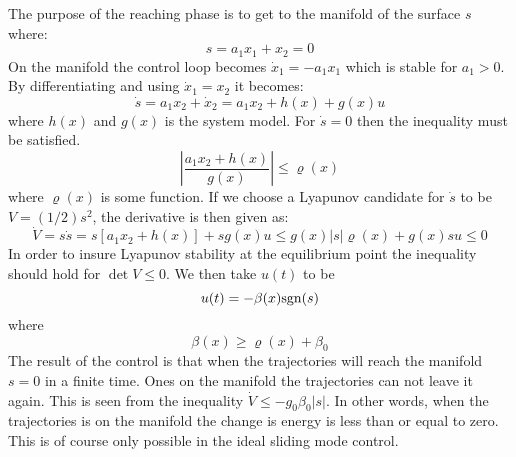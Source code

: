 The purpose of the reaching phase is to get to the manifold of the surface $s$ where:
\begin{equation}
  s = a_1 x_1 + x_2 = 0
\end{equation}
On the manifold the control loop becomes $ \dot{x}_1 = - a_1 x_1$ which is stable for $ a_1 > 0$.
By differentiating and using $ \dot{x}_1 = x_2 $ it becomes:
\begin{equation}
        \dot{s} = a_1 x_2 + \dot{x}_2 = a_1 x_2 + h(x) + g(x)u
\end{equation}
where $h(x)$ and $g(x)$ is the system model. For $\dot{s} = 0$ then the inequality must be satisfied.
\begin{equation}
        \left\vert \frac{a_1 x_2 + h(x)}{g(x)} \right\vert \leq \varrho(x)
\end{equation}
where $\varrho(x)$ is some function. If we choose a Lyapunov candidate for $\dot{s}$ to be $V = (1/2)s^2$, the derivative is then given as:
\begin{equation}
  \dot{V} = s \dot{s} =  s[a_1 x_2 + h(x)] + s g(x) u \leq g(x) \vert s\vert \varrho(x) + g(x) s u \leq 0
  \label{eq:lyap_dot}
\end{equation}
In order to insure Lyapunov stability at the equilibrium point the inequality should hold for $\det{V} \leq 0$. We then take $u(t)$ to be
\begin{equation}
  u(t) = -\beta(x) \mathrm{sgn}(s)
  \label{eq:control_ideal}
\end{equation}
where
\begin{equation}
  \beta (x) \geq \varrho (x) + \beta_0
\end{equation}
The result of the control is that when the trajectories will reach the manifold $s=0$ in a finite time. Ones on the manifold the trajectories can not leave it again. This is seen from the inequality $\dot{V} \leq -g_0 \beta_0 \vert s \vert$. In other words, when the trajectories is on the manifold the change is energy is less than or equal to zero. This is of course only possible in the ideal sliding mode control. 

